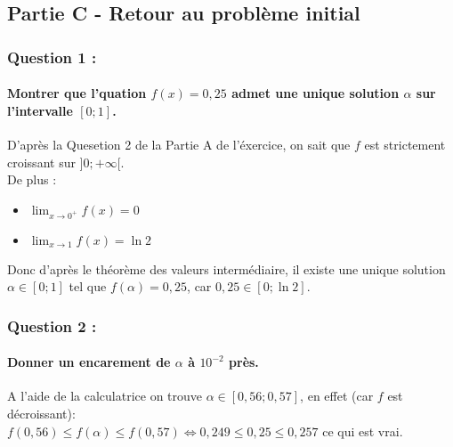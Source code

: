 \documentclass[a4paper, 12pt]{article}
\begin{document}
{}
\subsection*{Partie C - Retour au problème initial}

{}
\subsubsection*{Question 1 :}
\paragraph*{Montrer que l'quation $f(x) = 0,25$ admet une unique solution  $\alpha$ sur l'intervalle $[0;1]$.\\[5mm]}

D'après la Quesetion 2 de la Partie A de l'éxercice, on sait que $f$ est strictement croissant sur $]0;+\infty[$.
\\
De plus : 
\\
\begin{itemize}
    \item[\textbullet] $ \displaystyle \lim_{x \to 0^+}f(x)=0$ \\[1mm]
    \item[\textbullet] $ \displaystyle \lim_{x \to 1}f(x) = \ln{2} $ \\[1mm]
\end{itemize}
Donc d'après le théorème des valeurs intermédiaire, il existe une unique solution $\alpha \in [0;1]$ tel que $f(\alpha) = 0,25$, car $0,25 \in [0;\ln{2}]$.

{}
\subsubsection*{Question 2 :}
\paragraph*{Donner un encarement de $\alpha$ à $10^{-2}$ près.\\[5mm]}

A l'aide de la calculatrice on trouve $\alpha \in [0,56;0,57]$, en effet (car $f$ est décroissant): 
\\
$f(0,56) \leq f(\alpha) \leq f(0,57) \iff 0,249 \leq 0,25 \leq 0,257$ ce qui est vrai.
\end{document}
